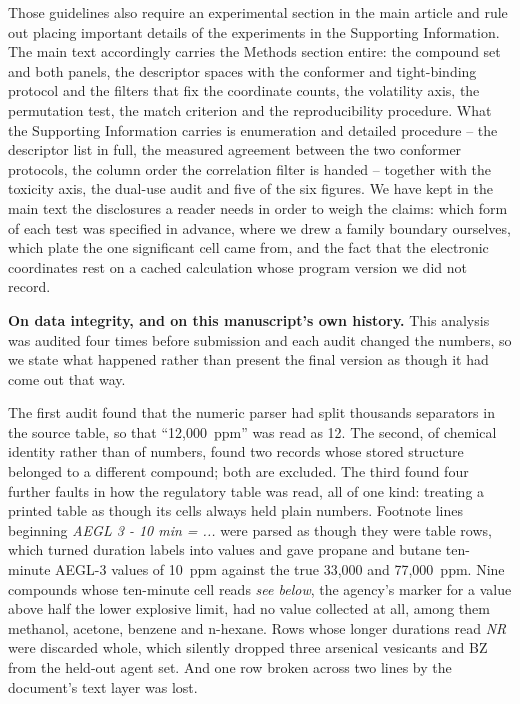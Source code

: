 \documentclass[11pt,a4paper]{article}
\begin{document}
Those guidelines also require an experimental section in the main article and
rule out placing important details of the experiments in the Supporting
Information. The main text accordingly carries the Methods section entire: the
compound set and both panels, the descriptor spaces with the conformer and
tight-binding protocol and the filters that fix the coordinate counts, the
volatility axis, the permutation test, the match criterion and the
reproducibility procedure. What the Supporting Information carries is
enumeration and detailed procedure -- the descriptor list in full, the measured
agreement between the two conformer protocols, the column order the correlation
filter is handed -- together with the toxicity axis, the dual-use audit and
five of the six figures. We have kept in the
main text the
disclosures a reader needs in order to weigh the claims: which form of each
test was specified in advance, where we drew a family boundary ourselves, which
plate the one significant cell came from, and the fact that the electronic
coordinates rest on a cached calculation whose program version we did not
record.

\textbf{On data integrity, and on this manuscript's own history.} This analysis
was audited four times before submission and each audit changed the numbers, so
we state what happened rather than present the final version as though it had
come out that way.

The first audit found that the numeric parser had split thousands separators in
the source table, so that ``12,000~ppm'' was read as 12. The second, of chemical
identity rather than of numbers, found two records whose stored structure
belonged to a different compound; both are excluded. The third found four further
faults in how the regulatory table was read, all of one kind: treating a printed
table as though its cells always held plain numbers. Footnote lines beginning
\textit{AEGL 3 - 10 min = ...} were parsed as though they were table rows, which
turned duration labels into values and gave propane and butane ten-minute
AEGL-3 values of 10~ppm against the true 33,000 and 77,000~ppm. Nine compounds
whose ten-minute cell reads \textit{see below}, the agency's marker for a value
above half the lower explosive limit, had no value collected at all, among them
methanol, acetone, benzene and n-hexane. Rows whose longer durations read
\textit{NR} were discarded whole, which silently dropped three arsenical
vesicants and BZ from the held-out agent set. And one row broken across two lines
by the document's text layer was lost.
\end{document}
